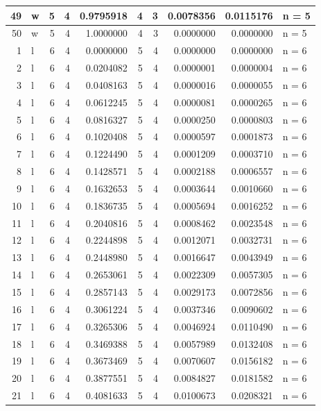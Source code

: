 \documentclass[
  letterpaper,
  DIV=11,
  numbers=noendperiod]{scrreprt}
\begin{document}
\begin{table}
\begin{tabular}[t]{r|l|r|r|r|r|r|r|r|l}
\hline
49 & w & 5 & 4 & 0.9795918 & 4 & 3 & 0.0078356 & 0.0115176 & n = 5\\
\hline
50 & w & 5 & 4 & 1.0000000 & 4 & 3 & 0.0000000 & 0.0000000 & n = 5\\
\hline
1 & l & 6 & 4 & 0.0000000 & 5 & 4 & 0.0000000 & 0.0000000 & n = 6\\
\hline
2 & l & 6 & 4 & 0.0204082 & 5 & 4 & 0.0000001 & 0.0000004 & n = 6\\
\hline
3 & l & 6 & 4 & 0.0408163 & 5 & 4 & 0.0000016 & 0.0000055 & n = 6\\
\hline
4 & l & 6 & 4 & 0.0612245 & 5 & 4 & 0.0000081 & 0.0000265 & n = 6\\
\hline
5 & l & 6 & 4 & 0.0816327 & 5 & 4 & 0.0000250 & 0.0000803 & n = 6\\
\hline
6 & l & 6 & 4 & 0.1020408 & 5 & 4 & 0.0000597 & 0.0001873 & n = 6\\
\hline
7 & l & 6 & 4 & 0.1224490 & 5 & 4 & 0.0001209 & 0.0003710 & n = 6\\
\hline
8 & l & 6 & 4 & 0.1428571 & 5 & 4 & 0.0002188 & 0.0006557 & n = 6\\
\hline
9 & l & 6 & 4 & 0.1632653 & 5 & 4 & 0.0003644 & 0.0010660 & n = 6\\
\hline
10 & l & 6 & 4 & 0.1836735 & 5 & 4 & 0.0005694 & 0.0016252 & n = 6\\
\hline
11 & l & 6 & 4 & 0.2040816 & 5 & 4 & 0.0008462 & 0.0023548 & n = 6\\
\hline
12 & l & 6 & 4 & 0.2244898 & 5 & 4 & 0.0012071 & 0.0032731 & n = 6\\
\hline
13 & l & 6 & 4 & 0.2448980 & 5 & 4 & 0.0016647 & 0.0043949 & n = 6\\
\hline
14 & l & 6 & 4 & 0.2653061 & 5 & 4 & 0.0022309 & 0.0057305 & n = 6\\
\hline
15 & l & 6 & 4 & 0.2857143 & 5 & 4 & 0.0029173 & 0.0072856 & n = 6\\
\hline
16 & l & 6 & 4 & 0.3061224 & 5 & 4 & 0.0037346 & 0.0090602 & n = 6\\
\hline
17 & l & 6 & 4 & 0.3265306 & 5 & 4 & 0.0046924 & 0.0110490 & n = 6\\
\hline
18 & l & 6 & 4 & 0.3469388 & 5 & 4 & 0.0057989 & 0.0132408 & n = 6\\
\hline
19 & l & 6 & 4 & 0.3673469 & 5 & 4 & 0.0070607 & 0.0156182 & n = 6\\
\hline
20 & l & 6 & 4 & 0.3877551 & 5 & 4 & 0.0084827 & 0.0181582 & n = 6\\
\hline
21 & l & 6 & 4 & 0.4081633 & 5 & 4 & 0.0100673 & 0.0208321 & n = 6\\

\end{tabular}
\end{table}
\end{document}
